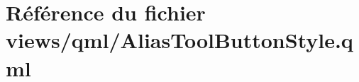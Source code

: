 \hypertarget{AliasToolButtonStyle_8qml}{\section{Référence du fichier views/qml/\-Alias\-Tool\-Button\-Style.qml}
\label{AliasToolButtonStyle_8qml}
}
